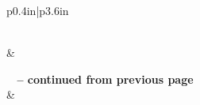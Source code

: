 \normalsize



 
\begin{center}
\begin{longtable}{p{0.4in}|p{3.6in}}
\caption[Word lengths for Joshua 24]{Word lengths for Joshua 24} \label{table:Word Lengths-JSH-24} \\ 
\hline {} &    \\ \hline 
\endfirsthead
 
{{\bfseries \tablename\ \thetable{} -- continued from previous page}} \\  
\hline {} &    \\ \hline 
\endhead
 

\end{longtable}
\end{center}
